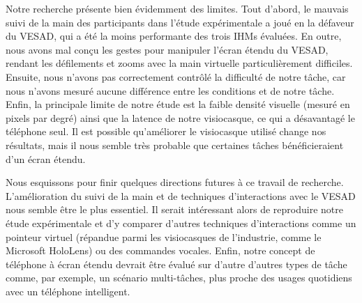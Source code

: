 Notre recherche présente bien évidemment des limites. Tout d'abord, le mauvais suivi de la main des participants dans l'étude expérimentale a joué en la défaveur du VESAD, qui a été la moins performante des trois IHMs évaluées. En outre, nous avons mal conçu les gestes pour manipuler l'écran étendu du VESAD, rendant les défilements et zooms avec la main virtuelle particulièrement difficiles. Ensuite, nous n'avons pas correctement contrôlé la difficulté de notre tâche, car nous n'avons mesuré aucune différence entre les conditions  et  de notre tâche. Enfin, la principale limite de notre étude est la faible densité visuelle (mesuré en pixels par degré) ainsi que la latence de notre visiocasque, ce qui a désavantagé le téléphone seul. Il est possible qu'améliorer le visiocasque utilisé change nos résultats, mais il nous semble très probable que certaines tâches bénéficieraient d'un écran étendu.

Nous esquissons pour finir quelques directions futures à ce travail de recherche. L'amélioration du suivi de la main et de techniques d'interactions avec le VESAD nous semble être le plus essentiel. Il serait intéressant alors de reproduire notre étude expérimentale et d'y comparer d'autres techniques d'interactions comme un pointeur virtuel (répandue parmi les visiocasques de l'industrie, comme le Microsoft HoloLens) ou des commandes vocales. Enfin, notre concept de téléphone à écran étendu devrait être évalué sur d'autre d'autres types de tâche comme, par exemple, un scénario multi-tâches, plus proche des usages quotidiens avec un téléphone intelligent.